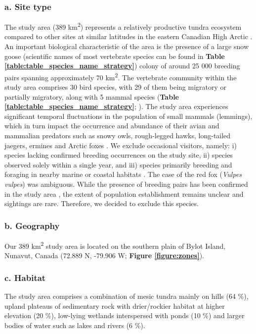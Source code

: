 \documentclass[a4paper,twoside,12pt]{article}
\begin{document}
                        \subsubsection*{a. Site type}
  The study area (389 km\textsuperscript{2}) represents a relatively productive tundra ecosystem compared to other sites at similar latitudes in the eastern Canadian High Arctic \citep{gauthier2024a}. An important biological characteristic of the area is the presence of a large snow goose (scientific names of most vertebrate species can be found in \textbf{Table \ref{table:table_species_name_strategy}}) colony of around 25 000 breeding pairs \citep{reed2002} spanning approximately 70 km\textsuperscript{2}. The vertebrate community within the study area comprises 30 bird species, with 29 of them being migratory or partially migratory, along with 5 mammal species (\textbf{Table \ref{table:table_species_name_strategy}}; \citet{moisan2023, gauthier2024a}). The study area experiences significant temporal fluctuations in the population of small mammals (lemmings), which in turn impact the occurrence and abundance of their avian and mammalian predators such as snowy owls, rough-legged hawks, long-tailed jaegers, ermines and Arctic foxes \citep{legagneux2012, duchesne2021}. We exclude occasional visitors, namely: i) species lacking confirmed breeding occurrences on the study site, ii) species observed solely within a single year, and iii) species primarily breeding and foraging in nearby marine or coastal habitats \citep{moisan2023}. The case of the red fox (\textit{Vulpes vulpes}) was ambiguous. While the presence of breeding pairs has been confirmed in the study area \citep{lai2022}, the extent of population establishment remains unclear and sightings are rare. Therefore, we decided to exclude this species.
                        
\newpage
                \subsubsection*{b. Geography} Our 389 km\textsuperscript{2} study area is located on the southern plain of Bylot Island, Nunavut, Canada (72.889 N, -79.906 W; \textbf{Figure \ref{figure:zones}}).
                \subsubsection*{c. Habitat}  The study area comprises a combination of mesic tundra mainly on hills (64 \%), upland plateaus of sedimentary rock with drier/rockier habitat at higher elevation (20 \%), low-lying wetlands interspersed with ponds (10 \%) and larger bodies of water such as lakes and rivers (6 \%).
\end{document}
